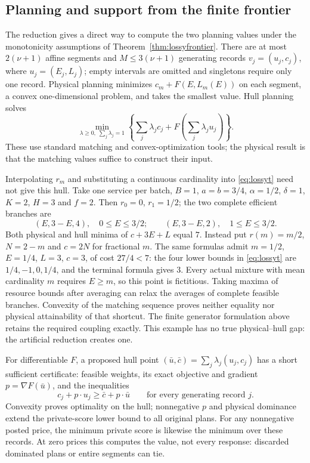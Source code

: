\subsection{Planning and support from the finite frontier}
\label{sec:lossyalgorithm}
The reduction gives a direct way to compute the two planning values under
the monotonicity assumptions of Theorem~\ref{thm:lossyfrontier}. There are
at most $2(\nu+1)$ affine segments and $M\le3(\nu+1)$ generating records
$v_j=(u_j,c_j)$, where $u_j=(E_j,L_j)$; empty intervals are omitted and
singletons require only one record. Physical planning minimizes
$c_m+F(E,L_m(E))$ on each segment, a convex one-dimensional problem,
and takes the smallest value. Hull planning solves
\[
 \min_{\lambda\ge0,\;\sum_j\lambda_j=1}
 \left\{\sum_j\lambda_jc_j+
 F\!\left(\sum_j\lambda_ju_j\right)\right\}.
\]
These use standard matching and convex-optimization tools; the physical
result is that the matching values suffice to construct their input.

\begin{remark}
\label{rem:fractionalcardinality}
Interpolating $r_m$ and substituting a continuous cardinality into
\eqref{eq:lossyt} need not give this hull. Take one service per batch,
$B=1$, $a=b=3/4$, $\alpha=1/2$, $\delta=1$, $K=2$, $H=3$ and $f=2$.
Then $r_0=0$, $r_1=1/2$; the two complete efficient branches are
\[
 (E,3-E,4),\quad 0\le E\le3/2;\qquad
 (E,3-E,2),\quad 1\le E\le3/2.
\]
Both physical and hull minima of $c+3E+L$ equal $7$. Instead put
$r(m)=m/2$, $N=2-m$ and $c=2N$ for fractional $m$. The same formulas
admit $m=1/2$, $E=1/4$, $L=3$, $c=3$, of cost $27/4<7$:
the four lower bounds in \eqref{eq:lossyt} are $1/4,-1,0,1/4$,
and the terminal formula gives $3$. Every actual mixture with mean
cardinality $m$ requires $E\ge m$, so this point is fictitious.
Taking maxima of resource bounds after averaging can relax the averages
of complete feasible branches. Convexity of the matching sequence proves
neither equality nor physical attainability of that shortcut. The finite
generator formulation above retains the required coupling exactly.
This example has no true physical--hull gap: the artificial reduction
creates one.
\end{remark}

For differentiable $F$, a proposed hull point
$(\bar u,\bar c)=\sum_j\lambda_j(u_j,c_j)$ has a short sufficient
certificate: feasible weights, its exact objective and gradient
$p=\nabla F(\bar u)$, and the inequalities
\[
 c_j+p\cdot u_j\ge\bar c+p\cdot\bar u
 \qquad\text{for every generating record }j.
\]
Convexity proves optimality on the hull; nonnegative $p$ and physical
dominance extend the private-score lower bound to all original plans.
For any nonnegative posted price, the minimum private score is likewise
the minimum over these records. At zero prices this computes the value,
not every response: discarded dominated plans or entire segments can tie.

